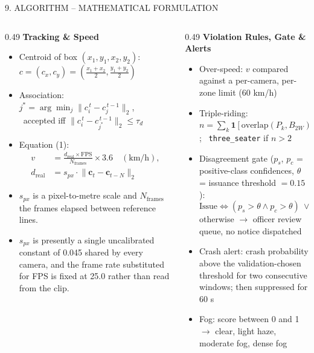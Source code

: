 \documentclass[aspectratio=169,10pt,t]{beamer}
\newcommand{\hd}[1]{{\color{dsblue}\textbf{#1}}}          %
\begin{document}
\begin{frame}{9. ALGORITHM -- MATHEMATICAL FORMULATION}
\begin{columns}[T,onlytextwidth]
\begin{column}{0.49\textwidth}
\hd{\small Tracking \& Speed}
\footnotesize
\begin{itemize}\setlength{\itemsep}{0.25em}
  \item Centroid of box $(x_1,y_1,x_2,y_2)$:\;
        $c=(c_x,c_y)=\left(\frac{x_1+x_2}{2},\frac{y_1+y_2}{2}\right)$
  \item Association: $j^{*}=\arg\min_j \lVert c_i^{\,t}-c_j^{\,t-1}\rVert_2$, \ accepted iff
        $\lVert c_i^{\,t}-c_{j^*}^{\,t-1}\rVert_2\le\tau_d$
  \item Equation (1):
        \[\begin{aligned}v &= \frac{d_{\mathrm{real}}\times \mathrm{FPS}}{N_{\mathrm{frames}}}\times 3.6 \quad (\mathrm{km/h}),\\
          d_{\mathrm{real}} &= s_{px}\cdot \lVert \mathbf{c}_t-\mathbf{c}_{t-N}\rVert_2\end{aligned}\]
  \item $s_{px}$ is a pixel-to-metre scale and $N_{\mathrm{frames}}$ the frames elapsed between reference lines.
  \item $s_{px}$ is presently a single uncalibrated constant of 0.045 shared by every camera, and the frame rate
        substituted for FPS is fixed at 25.0 rather than read from the clip.
\end{itemize}
\end{column}
\begin{column}{0.49\textwidth}
\hd{\small Violation Rules, Gate \& Alerts}
\footnotesize
\begin{itemize}\setlength{\itemsep}{0.25em}
  \item Over-speed: $v$ compared against a per-camera, per-zone limit (60 km/h)
  \item Triple-riding: \ $n=\sum_k \mathbf{1}\!\left[\text{overlap}(P_k,B_{2W})>\tau_o\right]$;
        \ \texttt{three\_seater} if $n>2$
  \item Disagreement gate ($p_s$, $p_c$ = positive-class confidences, $\theta$ = issuance threshold $=0.15$):
        \[\text{Issue}\iff (p_s>\theta \wedge p_c>\theta)\ \vee\ (p_s<\theta \wedge p_c<\theta)\]
        otherwise $\rightarrow$ officer review queue, no notice dispatched
  \item Crash alert: crash probability above the validation-chosen threshold for two consecutive windows; then
        suppressed for 60 s
  \item Fog: score between 0 and 1 $\rightarrow$ clear, light haze, moderate fog, dense fog
\end{itemize}
\end{column}
\end{columns}
\end{frame}
\end{document}
